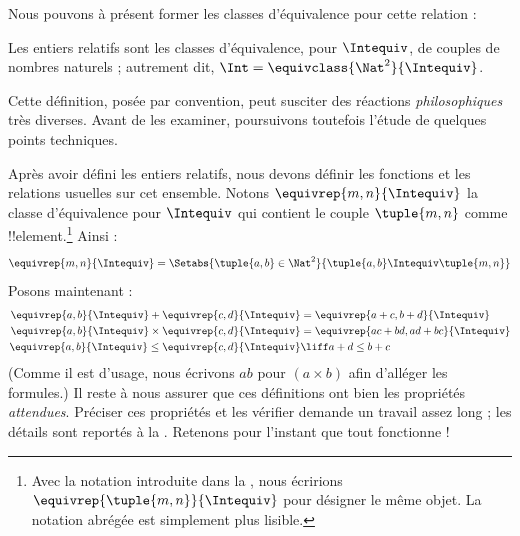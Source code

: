 \documentclass[../../../include/open-logic-section]{subfiles}
\begin{document}
Nous pouvons à présent former les classes d'équivalence pour cette relation :

\begin{defn}
		Les entiers relatifs sont les classes d'équivalence, pour $\Intequiv$, de couples de nombres naturels ; autrement dit, $\Int = \equivclass{\Nat^2}{\Intequiv}$.
\end{defn}

Cette définition, posée par convention, peut susciter des réactions \emph{philosophiques} très diverses. Avant de les examiner, poursuivons toutefois l'étude de quelques points techniques.

Après avoir défini les entiers relatifs, nous devons définir les fonctions et les relations usuelles sur cet ensemble. Notons $\equivrep{m, n}{\Intequiv}$ la classe d'équivalence pour $\Intequiv$ qui contient le couple $\tuple{m, n}$ comme !!{element}.\footnote{Avec la notation introduite dans la , nous écririons $\equivrep{\tuple{m,n}}{\Intequiv}$ pour désigner le même objet. La notation abrégée est simplement plus lisible.} Ainsi :
	$$\equivrep{m, n}{\Intequiv} = \Setabs{\tuple{a, b} \in \Nat^2}{\tuple{a, b}\Intequiv \tuple{m, n}}$$
Posons maintenant :
	\begin{align*}
		\equivrep{a, b}{\Intequiv} + \equivrep{c, d}{\Intequiv} &= \equivrep{a + c, b + d}{\Intequiv}\\
		\equivrep{a, b}{\Intequiv} \times \equivrep{c, d}{\Intequiv} &= \equivrep{a c + b  d, a  d + b c}{\Intequiv}\\
		\equivrep{a, b}{\Intequiv} \leq \equivrep{c, d}{\Intequiv} &\liff a + d \leq b + c
	\end{align*}
(Comme il est d'usage, nous écrivons $ab$ pour $(a \times b)$ afin d'alléger les formules.) Il reste à nous assurer que ces définitions ont bien les propriétés \emph{attendues}. Préciser ces propriétés et les vérifier demande un travail assez long ; les détails sont reportés à la . Retenons pour l'instant que tout fonctionne !{}
\end{document}
